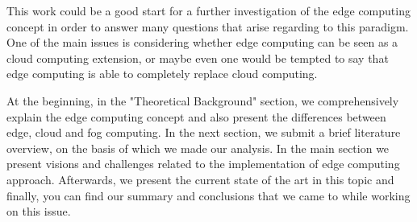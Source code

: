 This work could be a good start for a further investigation of the edge computing concept in order to answer many questions that arise regarding to this paradigm. One of the main issues is considering whether edge computing can be seen as a cloud computing extension, or maybe even one would be tempted to say that edge computing is able to completely replace cloud computing.\par
At the beginning, in the "Theoretical Background" section, we comprehensively explain the edge computing concept and also present the differences between edge, cloud and fog computing. In the next section, we submit a brief literature overview, on the basis of which we made our analysis. In the main section we present visions and challenges related to the implementation of edge computing approach. Afterwards, we present the current state of the art in this topic and finally, you can find our summary and conclusions that we came to while working on this issue.\par
